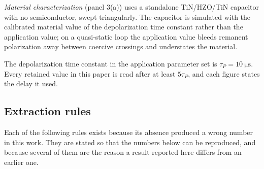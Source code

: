 \emph{Material characterization} (panel 3(a)) uses a standalone TiN/HZO/TiN capacitor
with no semiconductor, swept triangularly. The capacitor is simulated with the
calibrated material value of the depolarization time constant rather than the
application value; on a quasi-static loop the application value bleeds remanent
polarization away between coercive crossings and understates the material.

The depolarization time constant in the application parameter set is
$\tau_P=\SI{10}{\micro\second}$. Every retained value in this paper is read after at
least $5\tau_P$, and each figure states the delay it used.

\subsection{Extraction rules}
\label{sec:rules}

Each of the following rules exists because its absence produced a wrong number in this
work. They are stated so that the numbers below can be reproduced, and because several
of them are the reason a result reported here differs from an earlier one.

